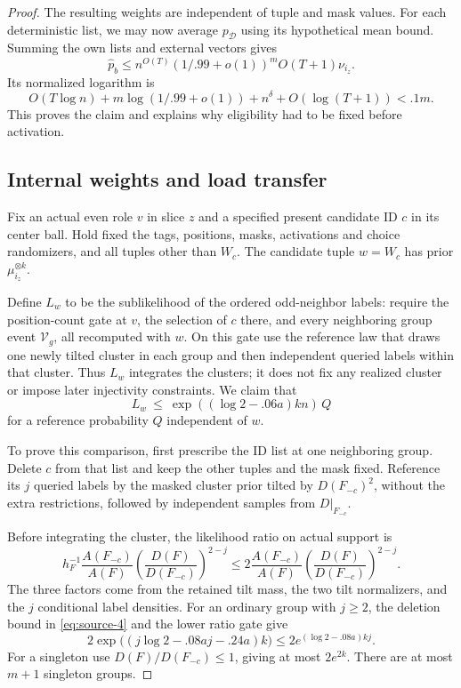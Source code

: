 \begin{proof}
The resulting weights are independent of tuple and mask values. For each deterministic list, we may now average \(p_{\mathcal D}\) using its hypothetical mean bound. Summing the own lists and external vectors gives
\[
 \widehat p_b\le
 n^{O(T)}(1/.99+o(1))^m O(T+1)\nu_{i_z}.
\]
Its normalized logarithm is
\[
 O(T\log n)+m\log(1/.99+o(1))+n^\delta+O(\log(T+1))<.1m.
\]
This proves the claim and explains why eligibility had to be fixed before activation.

\subsection{Internal weights and load transfer}
\label{sec:internal-weights-and-load-transfer}

Fix an actual even role \(v\) in slice \(z\) and a specified present candidate ID \(c\) in its center ball. Hold fixed the tags, positions, masks, activations and choice randomizers, and all tuples other than \(W_c\). The candidate tuple \(w=W_c\) has prior \(\mu_{i_z}^{\otimes k}\).

Define \(L_w\) to be the sublikelihood of the ordered odd-neighbor labels: require the position-count gate at \(v\), the selection of \(c\) there, and every neighboring group event \(\mathcal V_g\), all recomputed with \(w\). On this gate use the reference law that draws one newly tilted cluster in each group and then independent queried labels within that cluster. Thus \(L_w\) integrates the clusters; it does not fix any realized cluster or impose later injectivity constraints. We claim that
\begin{equation}
 L_w\ \le\ \exp((\log 2-.06 a)kn)\,Q
 \label{eq:source-5}
\end{equation}
for a reference probability \(Q\) independent of \(w\).

To prove this comparison, first prescribe the ID list at one neighboring group. Delete \(c\) from that list and keep the other tuples and the mask fixed. Reference its \(j\) queried labels by the masked cluster prior tilted by \(D(F_{-c})^2\), without the extra restrictions, followed by independent samples from \(D|_{F_{-c}}\).

Before integrating the cluster, the likelihood ratio on actual support is
\[
 h_F^{-1}\frac{A(F_{-c})}{A(F)}
       \left(\frac{D(F)}{D(F_{-c})}\right)^{2-j}
 \le2\frac{A(F_{-c})}{A(F)}
       \left(\frac{D(F)}{D(F_{-c})}\right)^{2-j}.
\]
The three factors come from the retained tilt mass, the two tilt normalizers, and the \(j\) conditional label densities. For an ordinary group with \(j\ge2\), the deletion bound in \eqref{eq:source-4} and the lower ratio gate give
\[
 2\exp\bigl((j\log2-.08aj-.24a)k\bigr)
       \le2e^{(\log2-.08a)kj}.
\]
For a singleton use \(D(F)/D(F_{-c})\le1\), giving at most \(2e^{2k}\). There are at most \(m+1\) singleton groups.


\end{proof}

